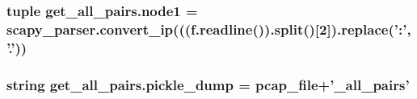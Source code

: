 \hypertarget{namespaceget__all__pairs_a8ac2e092f90c8fef4eddc9f665a71f51}{
\subsubsection[{node1}]{\setlength{\rightskip}{0pt plus 5cm}tuple get\-\_\-all\-\_\-pairs.\-node1 = {\bf scapy\-\_\-parser.\-convert\-\_\-ip}(((f.\-readline()).split()\mbox{[}2\mbox{]}).replace('\-:', '.'))}}\label{namespaceget__all__pairs_a8ac2e092f90c8fef4eddc9f665a71f51}
\hypertarget{namespaceget__all__pairs_adbdf902a06dba3da9796b4676966b41b}{
\subsubsection[{pickle\-\_\-dump}]{\setlength{\rightskip}{0pt plus 5cm}string get\-\_\-all\-\_\-pairs.\-pickle\-\_\-dump = pcap\-\_\-file+'\-\_\-all\-\_\-pairs'}}\label{namespaceget__all__pairs_adbdf902a06dba3da9796b4676966b41b}

